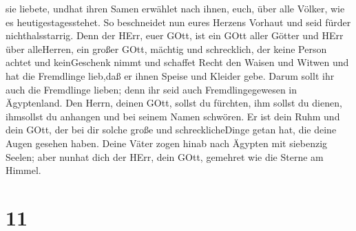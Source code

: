 sie liebete, undhat ihren Samen erwählet nach ihnen, euch, über alle
Völker, wie es heutigestagesstehet.  So beschneidet nun
eures Herzens Vorhaut und seid fürder nichthalsstarrig. 
Denn der HErr, euer GOtt, ist ein GOtt aller Götter und HErr über
alleHerren, ein großer GOtt, mächtig und schrecklich, der keine Person
achtet und keinGeschenk nimmt  und schaffet Recht den
Waisen und Witwen und hat die Fremdlinge lieb,daß er ihnen Speise und
Kleider gebe.  Darum sollt ihr auch die Fremdlinge lieben;
denn ihr seid auch Fremdlingegewesen in Ägyptenland.  Den
Herrn, deinen GOtt, sollst du fürchten, ihm sollst du dienen, ihmsollst
du anhangen und bei seinem Namen schwören.  Er ist dein
Ruhm und dein GOtt, der bei dir solche große und schrecklicheDinge getan
hat, die deine Augen gesehen haben.  Deine Väter zogen
hinab nach Ägypten mit siebenzig Seelen; aber nunhat dich der HErr, dein
GOtt, gemehret wie die Sterne am Himmel.

\hypertarget{section-10}{%
\section{11}\label{section-10}}

